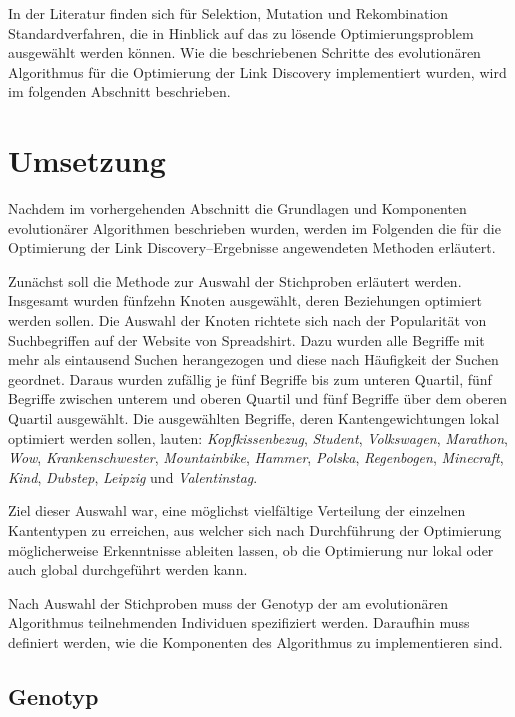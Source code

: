 In der Literatur \cite{kw2007, tw2008, dj2006} finden sich für Selektion, Mutation und Rekombination Standardverfahren, die in Hinblick auf das zu lösende Optimierungsproblem ausgewählt werden können. Wie die beschriebenen Schritte des evolutionären Algorithmus für die Optimierung der Link Discovery implementiert wurden, wird im folgenden Abschnitt beschrieben.

\section{Umsetzung}

Nachdem im vorhergehenden Abschnitt die Grundlagen und Komponenten evolutionärer Algorithmen beschrieben wurden, werden im Folgenden die für die Optimierung der Link Discovery--Ergebnisse angewendeten Methoden erläutert.

Zunächst soll die Methode zur Auswahl der Stichproben erläutert werden. Insgesamt wurden fünfzehn Knoten ausgewählt, deren Beziehungen optimiert werden sollen. Die Auswahl der Knoten richtete sich nach der Popularität von Suchbegriffen auf der Website von Spreadshirt. Dazu wurden alle Begriffe mit mehr als eintausend Suchen herangezogen und diese nach Häufigkeit der Suchen geordnet. Daraus wurden zufällig je fünf Begriffe bis zum unteren Quartil, fünf Begriffe zwischen unterem und oberen Quartil und fünf Begriffe über dem oberen Quartil ausgewählt. Die ausgewählten Begriffe, deren Kantengewichtungen lokal optimiert werden sollen, lauten: \emph{Kopfkissenbezug}, \emph{Student}, \emph{Volkswagen}, \emph{Marathon}, \emph{Wow}, \emph{Krankenschwester}, \emph{Mountainbike}, \emph{Hammer}, \emph{Polska}, \emph{Regenbogen}, \emph{Minecraft}, \emph{Kind}, \emph{Dubstep}, \emph{Leipzig} und \emph{Valentinstag}.

Ziel dieser Auswahl war, eine möglichst vielfältige Verteilung der einzelnen Kantentypen zu erreichen, aus welcher sich nach Durchführung der Optimierung möglicherweise Erkenntnisse ableiten lassen, ob die Optimierung nur lokal oder auch global durchgeführt werden kann.

Nach Auswahl der Stichproben muss der Genotyp der am evolutionären Algorithmus teilnehmenden Individuen spezifiziert werden. Daraufhin muss definiert werden, wie die Komponenten des Algorithmus zu implementieren sind.

\subsection{Genotyp}

